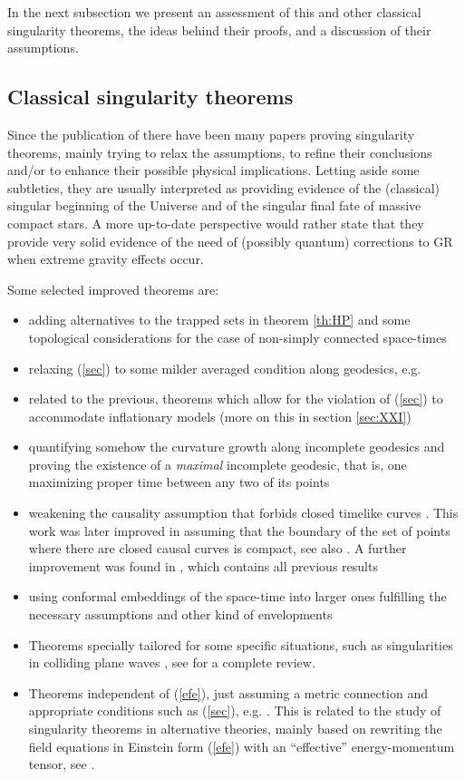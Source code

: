 \documentclass[12pt]{iopart}
\begin{document}
In the next subsection we present an assessment of this and other classical singularity theorems, the ideas behind their proofs, and a discussion of their assumptions.
 




\subsection{Classical singularity theorems}\label{subsec:thms}
Since the publication of \cite{P,HP} there have been many papers proving singularity theorems, mainly trying to relax the assumptions, to refine their conclusions and/or to enhance their possible physical implications. Letting aside some 
subtleties, they are usually interpreted as providing evidence of the (classical)
singular beginning of the Universe and of the singular final fate of massive compact
stars. A more up-to-date perspective would rather state that they provide very solid evidence of the need of (possibly quantum) corrections to GR when extreme gravity effects occur.

Some selected improved theorems are: 
\begin{itemize}
\item adding alternatives to the trapped sets in theorem \ref{th:HP} and some topological considerations for the case of non-simply connected space-times \cite{Gan,Gan2,Lee}
\item relaxing (\ref{sec}) to some milder averaged condition along geodesics, e.g.  \cite{T6,ChE,Bor,KR}
\item related to the previous, theorems which allow for the violation of (\ref{sec}) to accommodate inflationary models \cite{Bor2,BV,BV2,BV3} (more on this in section \ref{sec:XXI})
\item quantifying somehow the curvature growth along incomplete geodesics and proving the existence of a {\it maximal} incomplete geodesic, that is, one maximizing proper time between any two of its points \cite{Szab,KR}
\item weakening the causality assumption that forbids closed timelike curves  \cite{T,T4}. This
work was later improved in \cite{Kr} assuming that the boundary of the set of
points where there are closed causal curves is compact, see also \cite{Kriele}. A further improvement was found in \cite{MI},
which contains all previous results
\item using conformal embeddings of the space-time into larger ones fulfilling the necessary assumptions \cite{Kup} and other kind of envelopments \cite{AS}
\item Theorems specially tailored for some specific situations, such as singularities in colliding plane waves \cite{T7}, see \cite{Gri} for a complete review. 
\item Theorems independent of (\ref{efe}), just assuming a metric connection and appropriate conditions such as (\ref{sec}), e.g. \cite{Low,Sir}. This is related to the study of singularity theorems in alternative theories, mainly based on rewriting the field equations in Einstein form (\ref{efe}) with an ``effective'' energy-momentum tensor, see \cite{FKLMS}.
\end{itemize}
\end{document}
